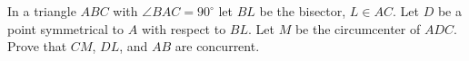 In a triangle $ABC$ with  $\angle BAC = 90^{\circ}$ let $BL$ be the bisector, $L\in AC$. Let $D$ be a point symmetrical to $A$ with respect to $BL$. Let  $M$ be the circumcenter of $ADC$. Prove that $CM$, $DL$, and $AB$ are concurrent.
